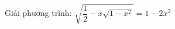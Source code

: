 \begin{baitap}
 Giải phương trình: $\sqrt{\dfrac{1 }{2 } -x \sqrt{1-x^2}  } = 1 - 2x^2 $
\begin{loigiai1}

\end{loigiai1}

\end{baitap}
